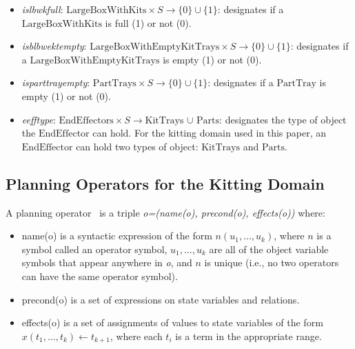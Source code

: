 \begin{small}
\begin{itemize}
\item \emph{islbwkfull}: $\mathrm{LargeBoxWithKits}\times S\rightarrow \lbrace 0\rbrace \cup \lbrace 1\rbrace$: designates if a $\mathrm{LargeBoxWithKits}$ is full (1) or not (0).

\item \emph{isblbwektempty}: $\mathrm{LargeBoxWithEmptyKitTrays}\times S\rightarrow \lbrace 0\rbrace \cup \lbrace 1\rbrace$: designates if a $\mathrm{LargeBoxWithEmptyKitTrays}$ is empty (1) or not (0).

\item \emph{isparttrayempty}: $\mathrm{PartTrays}\times S\rightarrow \lbrace 0\rbrace \cup \lbrace 1\rbrace$: designates if a $\mathrm{PartTray}$ is empty (1) or not (0).

\item \emph{eefftype}: $\mathrm{EndEffectors}\times S \rightarrow\mathrm{KitTrays}$ $\cup$ $\mathrm{Parts}$: designates the type of object the $\mathrm{EndEffector}$ can hold. For the kitting domain used in this paper, an $\mathrm{EndEffector}$ can hold two types of object: $\mathrm{KitTrays}$ and $\mathrm{Parts}$.
\end{itemize}
\end{small}


\subsection{Planning Operators for the Kitting Domain}
A planning operator~\cite{NAU.2004} is a triple \textit{o=(name(o), precond(o), effects(o))}
where:
\begin{itemize}
\item name(o) is a syntactic expression of the form $n(u_1,\dots,u_k)$, where $n$ is a symbol
called an operator symbol, $u_1,\dots,u_k$ are all of the object variable symbols that
appear anywhere in \textit{o}, and $n$ is unique (i.e., no two operators can have the
same operator symbol).
\item precond(o) is a set of expressions on state variables and relations.
\item effects(o) is a set of assignments of values to state variables of the form
$x(t_1,\dots,t_k)\leftarrow t_{k+1}$, where each $t_i$ is a term in the appropriate range.
\end{itemize}

